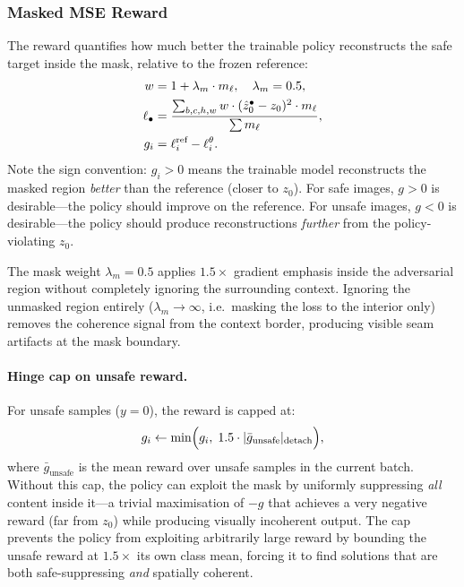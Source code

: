 \subsubsection{Masked MSE Reward}

The reward quantifies how much better the trainable policy reconstructs
the safe target inside the mask, relative to the frozen reference:
\begin{align}
  w &= 1 + \lambda_m \cdot m_\ell, \quad \lambda_m = 0.5, \notag
  \\
  \ell_\bullet &= \frac{\sum_{b,c,h,w} w \cdot (\hat{z}_0^\bullet - z_0)^2 \cdot m_\ell}
                       {\sum m_\ell}, \notag
                       \label{eq:masked_mse_bco} \\
  g_i &= \ell^\text{ref}_i - \ell^\theta_i. \notag 
\end{align}
Note the sign convention: $g_i > 0$ means the trainable model reconstructs
the masked region \emph{better} than the reference (closer to $z_0$).
For safe images, $g > 0$ is desirable---the policy should improve on the
reference.
For unsafe images, $g < 0$ is desirable---the policy should produce
reconstructions \emph{further} from the policy-violating $z_0$.

The mask weight $\lambda_m = 0.5$ applies $1.5\times$ gradient emphasis
inside the adversarial region without completely ignoring the surrounding
context.
Ignoring the unmasked region entirely ($\lambda_m \to \infty$, i.e.\ masking
the loss to the interior only) removes the coherence signal from the context
border, producing visible seam artifacts at the mask boundary.

\paragraph{Hinge cap on unsafe reward.}
For unsafe samples ($y=0$), the reward is capped at:
\begin{equation}
  g_i \leftarrow \min\!\Big(g_i,\;
    1.5 \cdot |\bar{g}_\text{unsafe}|_\text{detach}\Big), \notag
  \label{eq:hinge_cap}
\end{equation}
where $\bar{g}_\text{unsafe}$ is the mean reward over unsafe samples in
the current batch.
Without this cap, the policy can exploit the mask by uniformly suppressing
\emph{all} content inside it---a trivial maximisation of $-g$ that
achieves a very negative reward (far from $z_0$) while producing visually
incoherent output.
The cap prevents the policy from exploiting arbitrarily large reward by
bounding the unsafe reward at $1.5\times$ its own class mean,
forcing it to find solutions that are both safe-suppressing \emph{and}
spatially coherent.

